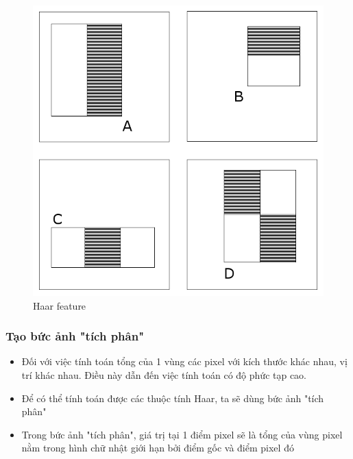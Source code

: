 \documentclass[a4paper]{article}
\begin{document}
\begin{figure} [H]
\centering
\includegraphics[scale=0.45]{haar.png}
\caption{ Haar feature}
\label{fig:haar}
\end{figure}

\subsubsection{Tạo bức ảnh "tích phân"}
\begin{itemize}
    \item Đối với việc tính toán tổng của 1 vùng các pixel với kích thước khác nhau, vị trí khác nhau. Điều này dẫn đến việc tính toán có độ phức tạp cao.
    \item Để có thể tính toán được các thuộc tính Haar, ta sẽ dùng bức ảnh "tích phân" 
    \item Trong bức ảnh "tích phân", giá trị tại 1 điểm pixel sẽ là tổng của vùng pixel nằm trong hình chữ nhật giới hạn bởi điểm gốc và điểm pixel đó 
\end{itemize}
\end{document}
